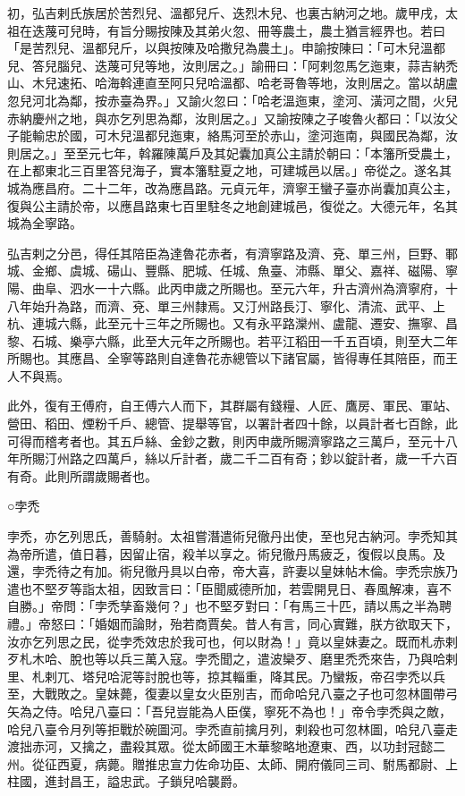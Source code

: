 \begin{pinyinscope}
 初，弘吉剌氏族居於苦烈兒、溫都兒斤、迭烈木兒、也裏古納河之地。歲甲戌，太祖在迭蔑可兒時，有旨分賜按陳及其弟火忽、冊等農土，農土猶言經界也。若曰「是苦烈兒、溫都兒斤，以與按陳及哈撒兒為農土」。申諭按陳曰：「可木兒溫都兒、答兒腦兒、迭蔑可兒等地，汝則居之。」諭冊曰：「阿剌忽馬乞迤東，蒜吉納禿山、木兒速拓、哈海斡連直至阿只兒哈溫都、哈老哥魯等地，汝則居之。當以胡盧忽兒河北為鄰，按赤臺為界。」又諭火忽曰：「哈老溫迤東，塗河、潢河之間，火兒赤納慶州之地，與亦乞列思為鄰，汝則居之。」又諭按陳之子唆魯火都曰：「以汝父子能輸忠於國，可木兒溫都兒迤東，絡馬河至於赤山，塗河迤南，與國民為鄰，汝則居之。」至至元七年，斡羅陳萬戶及其妃囊加真公主請於朝曰：「本籓所受農土，在上都東北三百里答兒海子，實本籓駐夏之地，可建城邑以居。」帝從之。遂名其城為應昌府。二十二年，改為應昌路。元貞元年，濟寧王蠻子臺亦尚囊加真公主，復與公主請於帝，以應昌路東七百里駐冬之地創建城邑，復從之。大德元年，名其城為全寧路。



 弘吉剌之分邑，得任其陪臣為達魯花赤者，有濟寧路及濟、兗、單三州，巨野、鄆城、金鄉、虞城、碭山、豐縣、肥城、任城、魚臺、沛縣、單父、嘉祥、磁陽、寧陽、曲阜、泗水一十六縣。此丙申歲之所賜也。至元六年，升古濟州為濟寧府，十八年始升為路，而濟、兗、單三州隸焉。又汀州路長汀、寧化、清流、武平、上杭、連城六縣，此至元十三年之所賜也。又有永平路灤州、盧龍、遷安、撫寧、昌黎、石城、樂亭六縣，此至大元年之所賜也。若平江稻田一千五百頃，則至大二年所賜也。其應昌、全寧等路則自達魯花赤總管以下諸官屬，皆得專任其陪臣，而王人不與焉。



 此外，復有王傅府，自王傅六人而下，其群屬有錢糧、人匠、鷹房、軍民、軍站、營田、稻田、煙粉千戶、總管、提舉等官，以署計者四十餘，以員計者七百餘，此可得而稽考者也。其五戶絲、金鈔之數，則丙申歲所賜濟寧路之三萬戶，至元十八年所賜汀州路之四萬戶，絲以斤計者，歲二千二百有奇；鈔以錠計者，歲一千六百有奇。此則所謂歲賜者也。



 ○孛禿



 孛禿，亦乞列思氏，善騎射。太祖嘗潛遣術兒徹丹出使，至也兒古納河。孛禿知其為帝所遣，值日暮，因留止宿，殺羊以享之。術兒徹丹馬疲乏，復假以良馬。及還，孛禿待之有加。術兒徹丹具以白帝，帝大喜，許妻以皇妹帖木倫。孛禿宗族乃遣也不堅歹等詣太祖，因致言曰：「臣聞威德所加，若雲開見日、春風解凍，喜不自勝。」帝問：「孛禿孳畜幾何？」也不堅歹對曰：「有馬三十匹，請以馬之半為聘禮。」帝怒曰：「婚姻而論財，殆若商賈矣。昔人有言，同心實難，朕方欲取天下，汝亦乞列思之民，從孛禿效忠於我可也，何以財為！」竟以皇妹妻之。既而札赤剌歹札木哈、脫也等以兵三萬入寇。孛禿聞之，遣波欒歹、磨里禿禿來告，乃與哈剌里、札剌兀、塔兒哈泥等討脫也等，掠其輜重，降其民。乃蠻叛，帝召孛禿以兵至，大戰敗之。皇妹薨，復妻以皇女火臣別吉，而命哈兒八臺之子也可忽林圖帶弓矢為之侍。哈兒八臺曰：「吾兒豈能為人臣僕，寧死不為也！」帝令孛禿與之敵，哈兒八臺令月列等拒戰於碗圖河。孛禿直前擒月列，剌殺也可忽林圖，哈兒八臺走渡拙赤河，又擒之，盡殺其眾。從太師國王木華黎略地遼東、西，以功封冠懿二州。從征西夏，病薨。贈推忠宣力佐命功臣、太師、開府儀同三司、駙馬都尉、上柱國，進封昌王，謚忠武。子鎖兒哈襲爵。




\end{pinyinscope}
